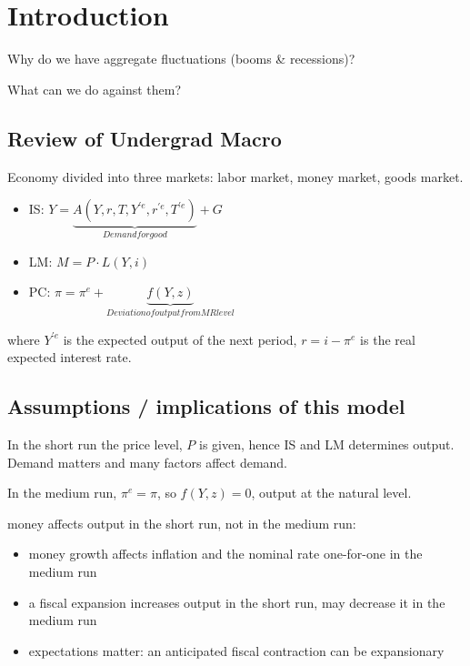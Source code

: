 \section{Introduction}
Why do we have aggregate fluctuations (booms \& recessions)?

What can we do against them?

\subsection{Review of Undergrad Macro}
Economy divided into three markets: labor market, money market,
goods market.
\begin{itemize}
  \item IS: $Y = \underset{Demand for good}{\underbrace{A(Y, r, T, Y^{\prime e}, r^{\prime e}, T^{\prime e} )}} + G$
  \item LM: $M = P\cdot L(Y, i)$
  \item PC: $\pi = \pi^e + \underset{Deviation of output from MR level}{\underbrace{f(Y, z)}}$
\end{itemize}
where $Y^{\prime e}$ is the expected output of the next period, $r = i - \pi^e$ is the real expected interest rate.

\subsection{Assumptions / implications of this model}
In the short run the price level, $P$ is given, hence IS and LM determines output. Demand matters and many factors affect demand.

In the medium run, $\pi^e = \pi$, so $f(Y, z) = 0$, output at the natural level. 

money affects output in the short run, not in the medium run:
\begin{itemize}
  \item money growth affects inflation and the nominal rate
  one-for-one in the medium run
  \item a fiscal expansion increases output in the short run, may
  decrease it in the medium run
  \item expectations matter: an anticipated fiscal contraction can be
  expansionary
\end{itemize}

